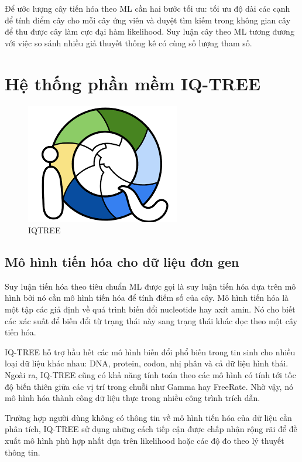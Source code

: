 \documentclass[12pt]{report}
\begin{document}
Để ước lượng cây tiến hóa theo ML cần hai bước tối ưu: tối ưu độ dài các cạnh để tính điểm cây cho mỗi cây ứng viên và duyệt tìm kiếm trong không gian cây để thu được cây làm cực đại hàm likelihood. Suy luận cây theo ML tương đương với việc so sánh nhiều giả thuyết thống kê có cùng số lượng tham số.


\section{Hệ thống phần mềm IQ-TREE}

\begin{figure}[h]
	\centering
	\includegraphics[scale=0.5]{Image/2.2.png}
	\caption{IQTREE}
	\label{fig:image2.2}
\end{figure}

\subsection{Mô hình tiến hóa cho dữ liệu đơn gen}
Suy luận tiến hóa theo tiêu chuẩn ML được gọi là suy luận tiến hóa dựa trên mô hình bởi nó cần mô hình tiến hóa để tính điểm số của cây. Mô hình tiến hóa là một tập các giả định về quá trình biến đổi nucleotide hay axít amin. Nó cho biết các xác suất để biến đổi từ trạng thái này sang trạng thái khác dọc theo một cây tiến hóa.

IQ-TREE hỗ trợ hầu hết các mô hình biến đổi phổ biến trong tin sinh cho nhiều loại dữ liệu khác nhau: DNA, protein, codon, nhị phân và cả dữ liệu hình thái. Ngoài ra, IQ-TREE cũng có khả năng tính toán theo các mô hình có tính tới tốc độ biến thiên giữa các vị trí trong chuỗi như Gamma hay FreeRate. Nhờ vậy, nó mô hình hóa thành công dữ liệu thực trong nhiều công trình trích dẫn.

Trường hợp người dùng không có thông tin về mô hình tiến hóa của dữ liệu cần phân tích, IQ-TREE sử dụng những cách tiếp cận được chấp nhận rộng rãi để đề xuất mô hình phù hợp nhất dựa trên likelihood hoặc các độ đo theo lý thuyết thông tin.
\end{document}
